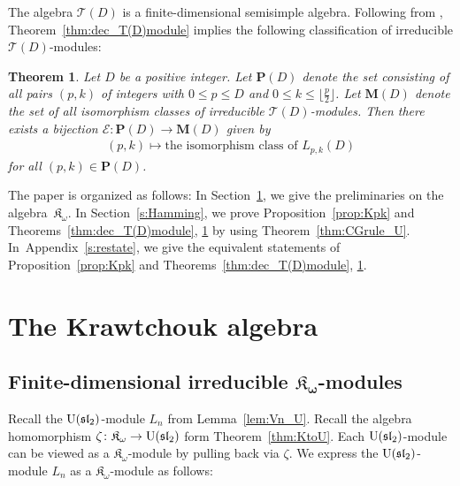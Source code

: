 \documentclass[10pt,a4paper]{amsart}
\def\K{\mathfrak K_\omega}
\def\T{\mathcal T}
\def\U{{\rm U}(\mathfrak{sl}_2)}
\numberwithin{equation}{section}
\newtheorem{Theorem}{Theorem}[section]
\begin{document}
The algebra $\T(D)$ is a finite-dimensional semisimple algebra. Following from \cite[Theorem~25.10]{Wedderburn1962}, Theorem~\ref{thm:dec_T(D)module} implies the following classification of irreducible $\T(D)$-modules:

\begin{Theorem}\label{thm:T(D)irrmodule}
Let $D$ be a positive integer. Let $\mathbf P(D)$ denote the set consisting of all pairs $(p,k)$ of integers with $0\leq p\leq D$ and $0\leq k\leq \big\lfloor \frac{p}{2}\big\rfloor$. Let $\mathbf M(D)$ denote the set of all isomorphism classes of irreducible $\T(D)$-modules. Then there exists a bijection $\mathcal E\colon \mathbf P(D)\to \mathbf M(D)$ given by
\begin{gather*}
(p,k) \mapsto \text{the isomorphism class of $L_{p,k}(D)$}
\end{gather*}
for all $(p,k)\in \mathbf P(D)$.
\end{Theorem}


The paper is organized as follows:
In Section~\ref{s:Hopf}, we give the preliminaries on the algebra~$\K$.
In Section~\ref{s:Hamming}, we prove Proposition~\ref{prop:Kpk} and Theorems~\ref{thm:dec_T(D)module}, \ref{thm:T(D)irrmodule} by using Theorem~\ref{thm:CGrule_U}.
In~Appendix~\ref{s:restate}, we give the equivalent statements of Proposition~\ref{prop:Kpk} and Theorems~\ref{thm:dec_T(D)module}, \ref{thm:T(D)irrmodule}.


\section{The Krawtchouk algebra}\label{s:Hopf}

\subsection[Finite-dimensional irreducible K\_w-modules]{Finite-dimensional irreducible $\boldsymbol{\K}$-modules}

Recall the $\U$-module $L_n$ from Lemma~\ref{lem:Vn_U}.
Recall the algebra homomorphism $\zeta\colon \K\to \U$ form Theorem~\ref{thm:KtoU}.
Each $\U$-module can be viewed as a $\K$-module by pulling back via $\zeta$.
We express the $\U$-module $L_n$ as a $\K$-module as follows:
\end{document}
